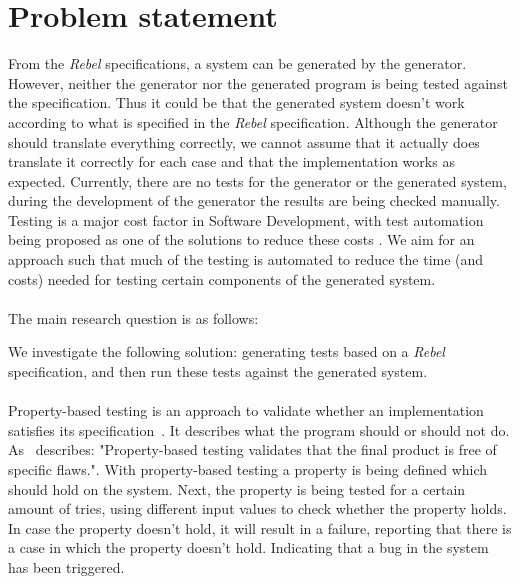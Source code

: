 \section{Problem statement}
From the \textit{Rebel} specifications, a system can be generated by the generator. However, neither the generator nor the generated program is being tested against the specification. Thus it could be that the generated system doesn't work according to what is specified in the \textit{Rebel} specification. Although the generator should translate everything correctly, we cannot assume that it actually does translate it correctly for each case and that the implementation works as expected. Currently, there are no tests for the generator or the generated system, during the development of the generator the results are being checked manually. Testing is a major cost factor in Software Development, with test automation being proposed as one of the solutions to reduce these costs \cite{ramler2006economic}. We aim for an approach such that much of the testing is automated to reduce the time (and costs) needed for testing certain components of the generated system.\\
\\
The main research question is as follows:
\begin{quote}
  \rqMain
\end{quote}
We investigate the following solution: generating tests based on a \textit{Rebel} specification, and then run these tests against the generated system.\\
\\
Property-based testing is an approach to validate whether an implementation satisfies its specification~\cite{fink1997property}. It describes what the program should or should not do. As~\cite{fink1997property} describes: "Property-based testing validates that the final product is free of specific flaws.". With property-based testing a property is being defined which should hold on the system. Next, the property is being tested for a certain amount of tries, using different input values to check whether the property holds. In case the property doesn't hold, it will result in a failure, reporting that there is a case in which the property doesn't hold. Indicating that a bug in the system has been triggered.\\
\\
